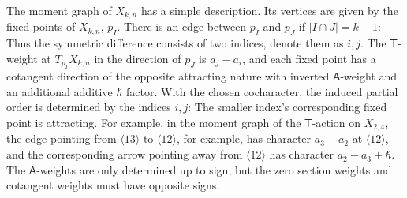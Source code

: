 \documentclass[12 pt]{article}
\theoremstyle{plain}
\theoremstyle{plain}
\theoremstyle{plain}
\theoremstyle{plain}
\theoremstyle{plain}
\theoremstyle{plain}
\theoremstyle{plain}
\theoremstyle{plain}
\theoremstyle{plain}
\theoremstyle{plain}
\theoremstyle{remark}
\theoremstyle{remark}
\theoremstyle{definition}
\theoremstyle{definition}
\theoremstyle{definition}
\theoremstyle{definition}
\theoremstyle{definition}
\theoremstyle{definition}
\newcommand{\bT}{\mathsf{T}}
\newcommand{\bA}{\mathsf{A}}
\begin{document}
The moment graph of $X_{k,n}$ has a simple description. Its vertices are given by the fixed points of $X_{k,n}$, $p_I$. There is an edge between $p_I$ and $p_J$ if $|I\cap J|=k-1$: Thus the symmetric difference consists of two indices, denote them as $i,j$. The $\bT$-weight at $T_{p_I}X_{k,n}$ in the direction of $p_J$ is $a_j-a_i$, and each fixed point has a cotangent direction of the opposite attracting nature with inverted $\bA$-weight and an additional additive $\hbar$ factor. With the chosen cocharacter, the induced partial order is determined by the indices $i,j$: The smaller index's corresponding fixed point is attracting. For example, in the moment graph of the $\bT$-action on $X_{2,4}$, the edge pointing from $\langle 13\rangle$ to $\langle 12\rangle$, for example, has character $a_3-a_2$ at $\langle 12\rangle$, and the corresponding arrow pointing away from $\langle 12\rangle$ has character $a_2-a_3+\hbar$. The $\bA$-weights are only determined up to sign, but the zero section weights and cotangent weights must have opposite signs. 
\end{document}
